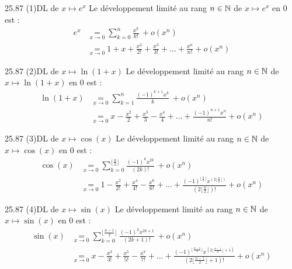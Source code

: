\begin{adjustwidth}{-3cm}{-3cm}
\begin{proposition}{25.87 (1)}{DL de $x \mapsto e^x$}
    Le développement limité au rang $n \in \mathbb{N}$ de $x \mapsto e^x$ en $0$ est :
    \begin{align*}
        e^x &\underset{x \to 0}{=} \sum_{k=0}^{n} \frac{x^k}{k!} \, + o(x^n) \\
        &\underset{x \to 0}{=} 1 + x + \frac{x^2}{2!} + \frac{x^3}{3!} + \dots + \frac{x^n}{n!} + o(x^n)
    \end{align*}
\end{proposition}

\begin{proposition}{25.87 (2)}{DL de $x \mapsto \ln(1+x)$}
    Le développement limité au rang $n \in \mathbb{N}$ de $x \mapsto \ln(1+x)$  en $0$ est :
    \begin{align*}
        \ln(1+x) &\underset{x \to 0}{=} \sum_{k=1}^{n} \frac{(-1)^{k+1}x^k}{k} \, + o(x^n) \\
        &\underset{x \to 0}{=} x - \frac{x^2}{2} + \frac{x^3}{3} - \frac{x^4}{4} + \dots + \frac{(-1)^{n+1}x^n}{n!} + o(x^n)
    \end{align*}
\end{proposition}

\begin{proposition}{25.87 (3)}{DL de $x \mapsto \cos(x)$}
    Le développement limité au rang $n \in \mathbb{N}$ de $x \mapsto \cos(x)$ en $0$ est :
    \begin{align*}
        \cos(x) &\underset{x \to 0}{=} \sum_{k=0}^{\lfloor \frac{n}{2} \rfloor} \frac{(-1)^{k}x^{2k}}{(2k)!} \, + o(x^n) \\
        &\underset{x \to 0}{=} 1 - \frac{x^2}{2!} + \frac{x^4}{4!} - \frac{x^6}{6!} + \dots + \frac{(-1)^{\lfloor \frac{n}{2}\rfloor} x^{(2\lfloor\frac{n}{2}\rfloor)}}{(2\lfloor\frac{n}{2}\rfloor)!} + o(x^n)
    \end{align*}
\end{proposition}

\begin{proposition}{25.87 (4)}{DL de $x \mapsto \sin(x)$}
    Le développement limité au rang $n \in \mathbb{N}$ de $x \mapsto \sin(x)$ en $0$ est :
    \begin{align*}
        \sin(x) &\underset{x \to 0}{=} \sum_{k=0}^{\lfloor \frac{n-1}{2} \rfloor} \frac{(-1)^{k}x^{2k+1}}{(2k+1)!} \, + o(x^n) \\
        &\underset{x \to 0}{=} x - \frac{x^3}{3!} + \frac{x^5}{5!} - \frac{x^7}{7!} + \dots + \frac{(-1)^{\lfloor \frac{n-1}{2}\rfloor} x^{(2\lfloor\frac{n-1}{2}\rfloor+1)}}{(2\lfloor\frac{n-1}{2}\rfloor+1)!} + o(x^n)
    \end{align*}
\end{proposition}


\end{adjustwidth}
